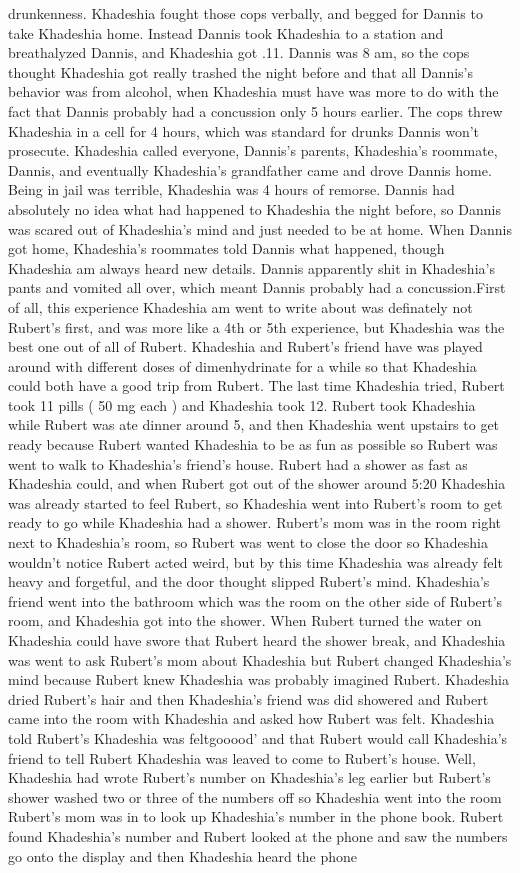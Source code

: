 \documentclass[12pt]{book}
\begin{document}
drunkenness. Khadeshia fought those cops verbally, and begged for Dannis to take Khadeshia home. Instead Dannis took Khadeshia to a station and breathalyzed Dannis, and Khadeshia got .11. Dannis was 8 am, so the cops thought Khadeshia got really trashed the night before and that all Dannis's behavior was from alcohol, when Khadeshia must have was more to do with the fact that Dannis probably had a concussion only 5 hours earlier. The cops threw Khadeshia in a cell for 4 hours, which was standard for drunks Dannis won't prosecute. Khadeshia called everyone, Dannis's parents, Khadeshia's roommate, Dannis, and eventually Khadeshia's grandfather came and drove Dannis home. Being in jail was terrible, Khadeshia was 4 hours of remorse. Dannis had absolutely no idea what had happened to Khadeshia the night before, so Dannis was scared out of Khadeshia's mind and just needed to be at home. When Dannis got home, Khadeshia's roommates told Dannis what happened, though Khadeshia am always heard new details. Dannis apparently shit in Khadeshia's pants and vomited all over, which meant Dannis probably had a concussion.First of all, this experience Khadeshia am went to write about was definately not Rubert's first, and was more like a 4th or 5th experience, but Khadeshia was the best one out of all of Rubert. Khadeshia and Rubert's friend have was played around with different doses of dimenhydrinate for a while so that Khadeshia could both have a good trip from Rubert. The last time Khadeshia tried, Rubert took 11 pills ( 50 mg each ) and Khadeshia took 12. Rubert took Khadeshia while Rubert was ate dinner around 5, and then Khadeshia went upstairs to get ready because Rubert wanted Khadeshia to be as fun as possible so Rubert was went to walk to Khadeshia's friend's house. Rubert had a shower as fast as Khadeshia could, and when Rubert got out of the shower around 5:20 Khadeshia was already started to feel Rubert, so Khadeshia went into Rubert's room to get ready to go while Khadeshia had a shower. Rubert's mom was in the room right next to Khadeshia's room, so Rubert was went to close the door so Khadeshia wouldn't notice Rubert acted weird, but by this time Khadeshia was already felt heavy and forgetful, and the door thought slipped Rubert's mind. Khadeshia's friend went into the bathroom which was the room on the other side of Rubert's room, and Khadeshia got into the shower. When Rubert turned the water on Khadeshia could have swore that Rubert heard the shower break, and Khadeshia was went to ask Rubert's mom about Khadeshia but Rubert changed Khadeshia's mind because Rubert knew Khadeshia was probably imagined Rubert. Khadeshia dried Rubert's hair and then Khadeshia's friend was did showered and Rubert came into the room with Khadeshia and asked how Rubert was felt. Khadeshia told Rubert's Khadeshia was feltgooood' and that Rubert would call Khadeshia's friend to tell Rubert Khadeshia was leaved to come to Rubert's house. Well, Khadeshia had wrote Rubert's number on Khadeshia's leg earlier but Rubert's shower washed two or three of the numbers off so Khadeshia went into the room Rubert's mom was in to look up Khadeshia's number in the phone book. Rubert found Khadeshia's number and Rubert looked at the phone and saw the numbers go onto the display and then Khadeshia heard the phone 
\end{document}
